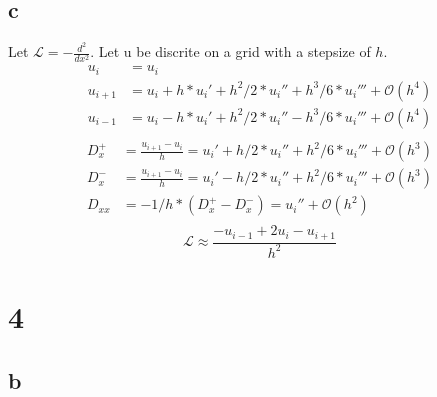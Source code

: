 \documentclass{article}
\begin{document}
\subsection{c}
Let $\mathcal{L}=-\frac{d^{2}}{d x^{2}}$. Let u be discrite on a grid with a stepsize of $h$.
\begin{align}
    u_i &= u_i\\
    u_{i+1} &= u_i + h * u_i' + h^2/2 * u_i'' + h^3/6 * u_i''' + \mathcal{O}\left(h^4\right)\\
    u_{i-1} &= u_i - h * u_i' + h^2/2 * u_i'' - h^3/6 * u_i''' + \mathcal{O}\left(h^4\right)\\
\end{align}
\begin{align}
    D_x^+ &= \frac{u_{i+1}-u_i}{h} = u_i' + h/2 * u_i'' + h^2/6 * u_i''' + \mathcal{O}\left(h^3\right)\\
    D_x^- &= \frac{u_{i+1}-u_i}{h} = u_i' - h/2 * u_i'' + h^2/6 * u_i''' + \mathcal{O}\left(h^3\right)\\
    D_{xx} &= -1/h*\left(D_x^+ - D_x^-\right) = u_i'' + \mathcal{O}\left(h^2\right)\\
\end{align}
\begin{equation}
    \mathcal{L} \approx \frac{-u_{i-1}+2u_i-u_{i+1}}{h^2}
\end{equation}

\section{4}
\newpage
\subsection{b}
\end{document}
